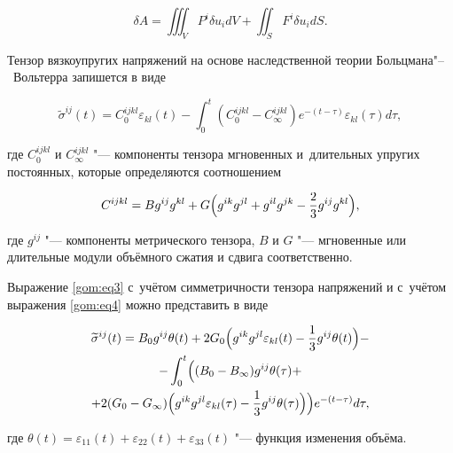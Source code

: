 $$\delta A=\iiint_{V} P^{i}\delta u_{i}dV+\iint_{S} F^{i}\delta u_{i}dS.$$



Тензор вязкоупругих напряжений на основе наследственной теории Больцмана"--~Вольтерра запишется в виде

\begin{equation}

\widetilde{\sigma}^{ij}(t)=C_{0}^{ijkl}\varepsilon_{kl}(t)-\int_{0}^t(C_{0}^{ijkl}-{C}_{\infty}^{ijkl})e^{-(t-\tau)}\varepsilon_{kl}(\tau)d\tau, 

\label{gom:eq3}

\end{equation}

где ${C}_{0}^{ijkl}$ и ${C}_{\infty}^{ijkl}$ "--- компоненты тензора мгновенных и~длительных упругих постоянных, которые определяются соотношением

\begin{equation}

C^{ijkl}=Bg^{ij}g^{kl}+G\Bigl(g^{ik}g^{jl}+g^{il}g^{jk}-\frac{2}{3}g^{ij}g^{kl}\Bigr), \label{gom:eq4}

\end{equation}

где $g^{ij}$ "--- компоненты метрического тензора, $B$ и $G$ "--- мгновенные или длительные модули объёмного сжатия и сдвига соответственно.



Выражение \eqref{gom:eq3} с~учётом симметричности тензора напряжений и с~учётом выражения \eqref{gom:eq4} можно представить в виде

\begin{multline}

\label{gom:eq5}

\widetilde{\sigma}^{ij}(t)=B_{0}g^{ij}\theta(t)+2G_{0}\Bigl(g^{ik}g^{jl}\varepsilon_{kl}(t)-\frac{1}{3}g^{ij}\theta(t)\Bigr)-

\\

-\int_{0}^t\Bigl((B_{0}-B_{\infty})g^{ij}\theta(\tau)+ \\ +2(G_{0}-  G_{\infty})\Bigl(g^{ik}g^{jl}\varepsilon_{kl}(\tau)-

\frac{1}{3}g^{ij}\theta(\tau)\Bigr)\Bigr)e^{-(t-\tau)}d\tau, 

\end{multline}

где $\theta(t)=\varepsilon_{11}(t)+\varepsilon_{22}(t)+\varepsilon_{33}(t)$ "--- функция изменения объёма.



